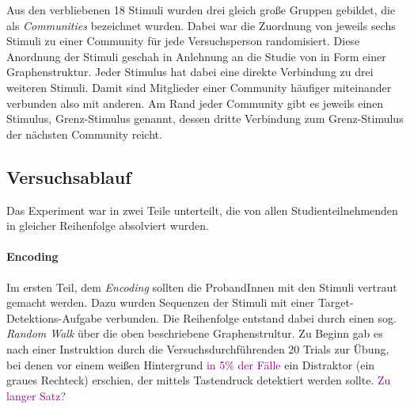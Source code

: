 Aus den verbliebenen 18 Stimuli wurden drei gleich große Gruppen gebildet, die als \textit{Communities} bezeichnet wurden. Dabei war die Zuordnung von jeweils sechs Stimuli zu einer Community für jede Versuchsperson randomisiert.
Diese Anordnung der Stimuli geschah in Anlehnung an die Studie von \citet{Schapiro2013} in Form einer Graphenstruktur. Jeder Stimulus  hat dabei eine direkte Verbindung zu drei weiteren Stimuli. Damit sind Mitglieder einer Community häufiger miteinander verbunden also mit anderen. Am Rand jeder Community gibt es jeweils einen Stimulus, Grenz-Stimulus genannt, dessen dritte Verbindung zum Grenz-Stimulus der nächsten Community reicht.


\subsection{Versuchsablauf}
Das Experiment war in zwei Teile unterteilt, die von allen Studienteilnehmenden in gleicher Reihenfolge absolviert wurden.

\paragraph{Encoding} Im ersten Teil, dem \textit{Encoding} sollten die ProbandInnen mit den Stimuli vertraut gemacht werden. Dazu wurden Sequenzen der Stimuli mit einer Target-Detektions-Aufgabe verbunden. Die Reihenfolge entstand dabei durch einen sog. \textit{Random Walk} über die oben beschriebene Graphenstrultur.
Zu Beginn gab es nach einer Instruktion durch die Versuchsdurchführenden 20 Trials zur Übung, bei denen vor einem weißen Hintergrund \textcolor{purple}{in 5\% der Fälle} ein Distraktor (ein graues Rechteck) erschien, der mittels Tastendruck detektiert werden sollte. \textcolor{purple}{Zu langer Satz?}

